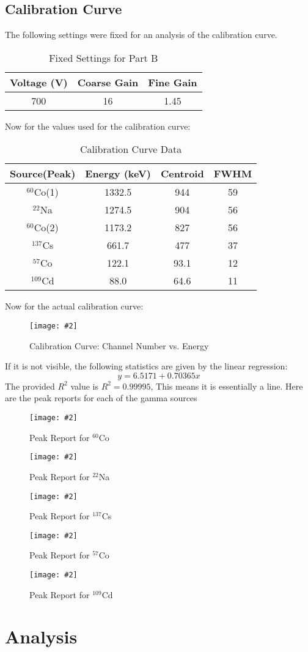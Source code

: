\documentclass[letterpaper,12pt]{article}
\newcommand{\labfig}[4]{
  \begin{figure}[H]
    \centering
    \texttt{[image: \#2]}
    \caption{#3}
    \label{#4}
  \end{figure}}
\begin{document}
\subsection{Calibration Curve}
The following settings were fixed for an analysis of the calibration curve.
\begin{table}[H]
  \centering
  \begin{tabular}{c|c|c}
    Voltage (\si{\volt}) & Coarse Gain & Fine Gain \\\hline
    700 & 16 & 1.45
  \end{tabular}
  \caption{Fixed Settings for Part B}
  \label{tab:5}
\end{table}
Now for the values used for the calibration curve:
\begin{table}[H]
  \centering
  \begin{tabular}{c|c|c|c}
    Source(Peak)&Energy (\si{\keV})&Centroid& FWHM \\\hline
    $^{60}$Co(1) & 1332.5 & 944 & 59\\
    $^{22}$Na & 1274.5 & 904 & 56\\
    $^{60}$Co(2) & 1173.2 & 827 & 56\\
    $^{137}$Cs & 661.7 & 477 & 37\\
    $^{57}$Co & 122.1 & 93.1 & 12\\
    $^{109}$Cd & 88.0 & 64.6 & 11
  \end{tabular}
  \caption{Calibration Curve Data}
  \label{tab:6}
\end{table}
Now for the actual calibration curve:
\labfig{9.0}{chve}{Calibration Curve: Channel Number vs. Energy}{chve}
If it is not visible, the following statistics are given by the linear regression:
\begin{equation}
  \label{eq:fit}
  y=6.5171+0.70365x
\end{equation}
The provided $R^2$ value is $R^2=0.99995$, This means it is essentially a line. 
\newpage
Here are the peak reports for each of the gamma sources
\labfig{17.0}{co60}{Peak Report for $^{60}$Co}{co60}
\labfig{17.0}{na22}{Peak Report for $^{22}$Na}{na22}
\labfig{17.0}{cs137}{Peak Report for $^{137}$Cs}{cs137}
\labfig{17.0}{co57}{Peak Report for $^{57}$Co}{co57}
\labfig{17.0}{cd109}{Peak Report for $^{109}$Cd}{cd109}
\newpage
\section{Analysis}
\end{document}
